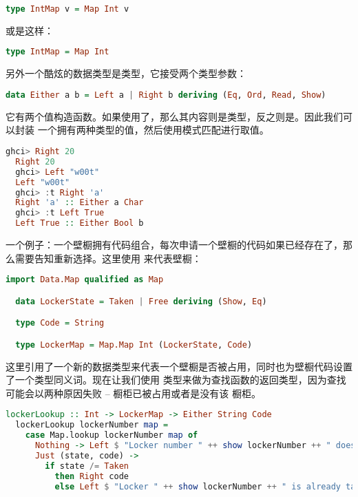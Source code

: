 \documentclass[./main.tex]{subfiles}
\begin{document}
\begin{lstlisting}[language=Haskell]
  type IntMap v = Map Int v
\end{lstlisting}

或是这样：

\begin{lstlisting}[language=Haskell]
  type IntMap = Map Int
\end{lstlisting}

另外一个酷炫的数据类型是类型，它接受两个类型参数：

\begin{lstlisting}[language=Haskell]
  data Either a b = Left a | Right b deriving (Eq, Ord, Read, Show)
\end{lstlisting}

它有两个值构造函数。如果使用了，那么其内容则是类型，反之则是。因此我们可以封装
一个拥有两种类型的值，然后使用模式匹配进行取值。

\begin{lstlisting}[language=Haskell]
  ghci> Right 20
  Right 20
  ghci> Left "w00t"
  Left "w00t"
  ghci> :t Right 'a'
  Right 'a' :: Either a Char
  ghci> :t Left True
  Left True :: Either Bool b
\end{lstlisting}

一个例子：一个壁橱拥有代码组合，每次申请一个壁橱的代码如果已经存在了，那么需要告知重新选择。这里使用
来代表壁橱：

\begin{lstlisting}[language=Haskell]
  import Data.Map qualified as Map

  data LockerState = Taken | Free deriving (Show, Eq)

  type Code = String

  type LockerMap = Map.Map Int (LockerState, Code)
\end{lstlisting}

这里引用了一个新的数据类型来代表一个壁橱是否被占用，同时也为壁橱代码设置了一个类型同义词。现在让我们使用
类型来做为查找函数的返回类型，因为查找可能会以两种原因失败 -- 橱柜已被占用或者是没有该
橱柜。

\begin{lstlisting}[language=Haskell]
  lockerLookup :: Int -> LockerMap -> Either String Code
  lockerLookup lockerNumber map =
    case Map.lookup lockerNumber map of
      Nothing -> Left $ "Locker number " ++ show lockerNumber ++ " doesn't exist!"
      Just (state, code) ->
        if state /= Taken
          then Right code
          else Left $ "Locker " ++ show lockerNumber ++ " is already taken!"
\end{lstlisting}
\end{document}
